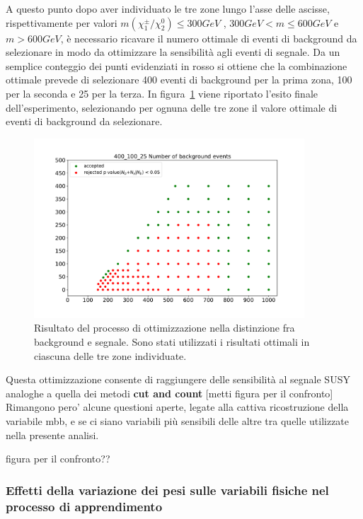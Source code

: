 A questo punto dopo aver individuato le tre zone lungo l'asse delle ascisse, rispettivamente per valori $ m(\chi^\pm_1/\chi^0_2) \le 300 GeV$ , $300 GeV < m \le 600 GeV$ e $m > 600 GeV$, è necessario ricavare il numero ottimale di eventi di background da selezionare in modo da ottimizzare la sensibilità agli eventi di segnale. Da un semplice conteggio dei punti evidenziati in rosso si ottiene che la combinazione ottimale prevede di selezionare 400 eventi di background per la prima zona, 100 per la seconda e 25 per la terza. In figura~\ref{mix} viene riportato l'esito finale dell'esperimento, selezionando per ognuna delle tre zone il valore ottimale di eventi di background da selezionare.

\begin{figure}[h!]
	\centering
	\includegraphics[width=0.90\textwidth]{figs/risultati_simulazione/mix.pdf}
	\caption{Risultato del processo di ottimizzazione nella distinzione fra background e segnale. Sono stati utilizzati i risultati ottimali in ciascuna delle tre zone individuate.}
	\label{mix}
\end{figure}

Questa ottimizzazione consente di raggiungere delle sensibilità al segnale SUSY analoghe a quella dei metodi \textbf{cut and count} [metti figura per il confronto]
Rimangono pero' alcune questioni aperte, legate alla cattiva ricostruzione della variabile mbb, e se ci siano variabili più sensibili delle altre tra quelle utilizzate nella presente analisi.

\color{red}
figura per il confronto??
\color{black}

\newpage

\subsubsection{Effetti della variazione dei pesi sulle variabili fisiche nel processo di apprendimento}
\label{effetti variazione pesi}


